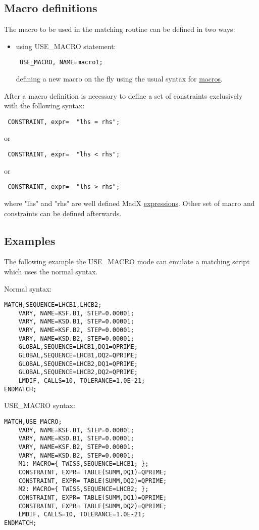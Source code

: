 \subsection{Macro definitions}
The macro to be used in the matching routine can be defined in two ways:
 
\begin{itemize}
   \item using USE\_MACRO statement:
\begin{verbatim}
 USE_MACRO, NAME=macro1;
\end{verbatim}
defining a new macro on the fly using the usual syntax for
\href{../control/special.html#macro}{ macros}.  
\end{itemize}
 
After a macro definition is necessary to define a set of constraints exclusively with the following syntax:
 
\begin{verbatim}
 CONSTRAINT, expr=  "lhs = rhs"; 
\end{verbatim}
or 
\begin{verbatim}
 CONSTRAINT, expr=  "lhs < rhs"; 
\end{verbatim}
or
\begin{verbatim}
 CONSTRAINT, expr=  "lhs > rhs"; 
\end{verbatim}

where "lhs" and "rhs" are well defined MadX
\href{../Introduction/expression.html}{expressions}. Other set of macro
and constraints can be defined afterwards. 

\subsection{Examples}
The following example the USE\_MACRO mode can emulate a matching script
which uses the normal syntax. 

Normal syntax:

\begin{verbatim}
MATCH,SEQUENCE=LHCB1,LHCB2;
    VARY, NAME=KSF.B1, STEP=0.00001;
    VARY, NAME=KSD.B1, STEP=0.00001;
    VARY, NAME=KSF.B2, STEP=0.00001;
    VARY, NAME=KSD.B2, STEP=0.00001;
    GLOBAL,SEQUENCE=LHCB1,DQ1=QPRIME;
    GLOBAL,SEQUENCE=LHCB1,DQ2=QPRIME;
    GLOBAL,SEQUENCE=LHCB2,DQ1=QPRIME;
    GLOBAL,SEQUENCE=LHCB2,DQ2=QPRIME;
    LMDIF, CALLS=10, TOLERANCE=1.0E-21;
ENDMATCH;
\end{verbatim}

USE\_MACRO syntax:

\begin{verbatim}
MATCH,USE_MACRO;
    VARY, NAME=KSF.B1, STEP=0.00001;
    VARY, NAME=KSD.B1, STEP=0.00001;
    VARY, NAME=KSF.B2, STEP=0.00001;
    VARY, NAME=KSD.B2, STEP=0.00001;
    M1: MACRO={ TWISS,SEQUENCE=LHCB1; };
    CONSTRAINT, EXPR= TABLE(SUMM,DQ1)=QPRIME;
    CONSTRAINT, EXPR= TABLE(SUMM,DQ2)=QPRIME;
    M2: MACRO={ TWISS,SEQUENCE=LHCB2; };
    CONSTRAINT, EXPR= TABLE(SUMM,DQ1)=QPRIME;
    CONSTRAINT, EXPR= TABLE(SUMM,DQ2)=QPRIME;
    LMDIF, CALLS=10, TOLERANCE=1.0E-21;
ENDMATCH;
\end{verbatim}


